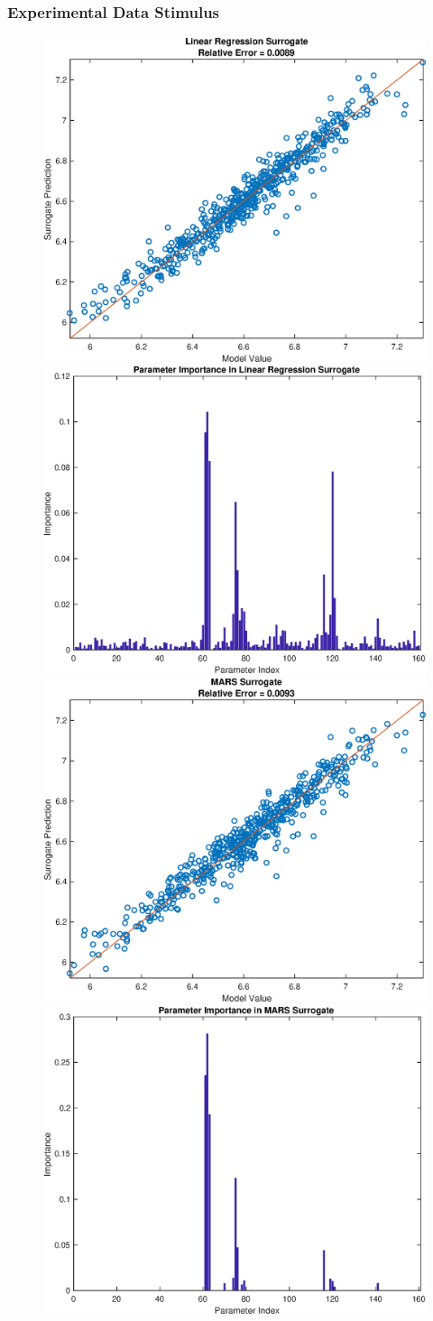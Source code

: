 \documentclass[12pt]{article}
\numberwithin{equation}{section}
\begin{document}
\newpage

\subsubsection{Experimental Data Stimulus}

\begin{figure}[h]
\centering
\includegraphics[width=.49 \textwidth]{Figures/K_ECS_Mean_QoI_LR_Prediction_Experimental.eps}
\includegraphics[width=.49 \textwidth]{Figures/K_ECS_Mean_QoI_LR_VI_Experimental.eps}\\
\includegraphics[width=.49 \textwidth]{Figures/K_ECS_Mean_QoI_MARS_Prediction_Experimental.eps}
\includegraphics[width=.49 \textwidth]{Figures/K_ECS_Mean_QoI_MARS_VI_Experimental.eps}
\end{figure}
\end{document}
